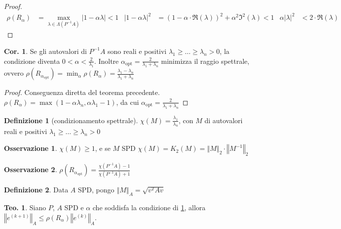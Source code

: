 \documentclass[a4paper,10pt]{article}
\theoremstyle{definition}
\theoremstyle{indentdefinition}
\newtheorem{defn}{Definizione}[section]
\theoremstyle{indenttheorem}
\newtheorem{thm}{Teo.}
\newtheorem{cor}{Cor.}
\theoremstyle{myremark}
\newtheorem*{rem*}{Osservazione}
\theoremstyle{indentgeneral}
\theoremstyle{plain}
\theoremstyle{plain}
\begin{document}
\begin{proof}
\begin{align*}
\rho\left(R_{\alpha}\right) & =\max_{\lambda\in\Lambda\left(P^{-1}A\right)}\left|1-\alpha\lambda\right|<1 & \left|1-\alpha\lambda\right|^{2} & =\left(1-\alpha\cdot\Re\left(\lambda\right)\right)^{2}+\alpha^{2}\Im^{2}\left(\lambda\right)<1 & \alpha\left|\lambda\right|^{2} & <2\cdot\Re\left(\lambda\right)
\end{align*}
\end{proof}
\begin{cor}
\label{cor:convergenza-richardson-autovalori-reali-positivi}Se gli
autovalori di $P^{-1}A$ sono reali e positivi $\lambda_{1}\geq\ldots\geq\lambda_{n}>0$,
la condizione diventa $0<\alpha<\frac{2}{\lambda_{1}}$. Inoltre $\alpha_{\text{opt}}=\frac{2}{\lambda_{1}+\lambda_{n}}$
minimizza il raggio spettrale, ovvero $\rho\left(R_{\alpha_{\text{opt}}}\right)=\min_{\alpha}\rho\left(R_{\alpha}\right)=\frac{\lambda_{1}-\lambda_{n}}{\lambda_{1}+\lambda_{n}}$
\end{cor}

\begin{proof}
Conseguenza diretta del teorema precedente. $\rho\left(R_{\alpha}\right)=\max\left(1-\alpha\lambda_{n},\alpha\lambda_{1}-1\right)$,
da cui $\alpha_{\text{opt}}=\frac{2}{\lambda_{1}+\lambda_{n}}$
\end{proof}
\begin{defn}[condizionamento spettrale]
$\chi\left(M\right)=\frac{\lambda_{1}}{\lambda_{n}}$, con $M$ di
autovalori reali e positivi $\lambda_{1}\geq\ldots\geq\lambda_{n}>0$
\end{defn}

\begin{rem*}
$\chi\left(M\right)\geq1$, e se $M$ SPD $\chi\left(M\right)=K_{2}\left(M\right)=\left\Vert M\right\Vert _{2}\cdot\left\Vert M^{-1}\right\Vert _{2}$
\end{rem*}
%
\begin{rem*}
$\rho\left(R_{\alpha_{\text{opt}}}\right)=\frac{\chi\left(P^{-1}A\right)-1}{\chi\left(P^{-1}A\right)+1}$
\end{rem*}
\begin{defn}
Data $A$ SPD, pongo $\left\Vert M\right\Vert _{A}=\sqrt{v^{T}Av}$
\end{defn}

\begin{thm}
\label{thm:stima-errore-richardson}Siano $P$, $A$ SPD e $\alpha$
che soddisfa la condizione di \ref{cor:convergenza-richardson-autovalori-reali-positivi},
allora $\left\Vert e^{\left(k+1\right)}\right\Vert _{A}\leq\rho\left(R_{\alpha}\right)\left\Vert e^{\left(k\right)}\right\Vert _{A}$.
\end{thm}
\end{document}
